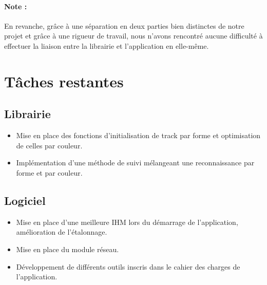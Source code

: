 \documentclass{article}
\begin{document}
			\paragraph{Note : \\}
			En revanche, grâce à une séparation en deux parties bien distinctes de notre projet et grâce à une rigueur de travail, nous n'avons rencontré aucune difficulté à effectuer la liaison entre la librairie et l'application en elle-même.
	\section{Tâches restantes}
		\subsection{Librairie}
		\begin{itemize}
		\item Mise en place des fonctions d'initialisation de track par forme et optimisation de celles par couleur.
		\item Implémentation d'une méthode de suivi mélangeant une reconnaissance par forme et par couleur.
		\end{itemize}
		\subsection{Logiciel}
		\begin{itemize}
		\item Mise en place d'une meilleure IHM lors du démarrage de l'application, amélioration de l'étalonnage.
		\item Mise en place du module réseau.
		\item Développement de différents outils inscris dans le cahier des charges de l'application.
		\end{itemize}
\end{document}
